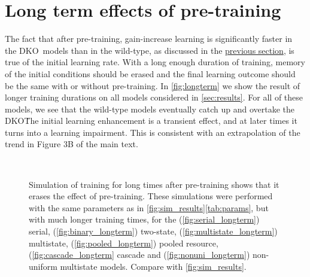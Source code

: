 \documentclass[10pt]{article}
\renewenvironment{myenumA}{\begin{inparaenum}[\bfseries A]}{\end{inparaenum}}
\newcommand{\KO}{DKO}
\newcommand{\datafig}[1][B]{Figure 3#1 of the main text}
\begin{document}


\section{Long term effects of pre-training}\label{sec:longterm}


The fact that after pre-training, gain-increase learning is significantly faster in the \KO\ models than in the wild-type, as discussed in the \hyperref[sec:results]{previous section}, is true of the initial learning rate.
With a long enough duration of training, memory of the initial conditions should be erased and the final learning outcome should be the same with or without pre-training.
In \autoref{fig:longterm} we show the result of longer training durations on all models considered in \autoref{sec:results}.
For all of these models, we see that the wild-type models eventually catch up and overtake the \KO\.
The initial learning enhancement is a transient effect, and at later times it turns into a learning impairment.
This is consistent with an extrapolation of the trend in \datafig.




\begin{figure}
\begin{preview}
  \centering
  \begin{myenumA}
  \item{}\label{fig:serial_longterm}
  \item{}\label{fig:binary_longterm}
  \item{}\label{fig:multistate_longterm} \\
  \item{}\label{fig:pooled_longterm}
  \item{}\label{fig:cascade_longterm}
  \item{}\label{fig:nonuni_longterm}
  \end{myenumA}
\end{preview}
  \caption{ Simulation of training for long times after pre-training shows that it erases the effect of pre-training.
  These simulations were performed with the same parameters as in \autoref{fig:sim_results}\ref{tab:params}, but with much longer training times, for the (\ref{fig:serial_longterm}) serial, (\ref{fig:binary_longterm}) two-state, (\ref{fig:multistate_longterm}) multistate, (\ref{fig:pooled_longterm}) pooled resource, (\ref{fig:cascade_longterm} cascade and (\ref{fig:nonuni_longterm}) non-uniform multistate models.
  Compare with \autoref{fig:sim_results}.
  }\label{fig:longterm}
\end{figure}
\end{document}
